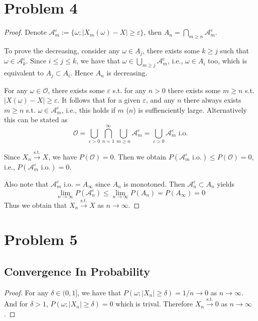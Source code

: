     \section{Problem 4}
    \begin{proof}
        Denote $\mathcal A_m^\varepsilon:=\{\omega;|X_m(\omega)-X|\geq\varepsilon\}$,
        then $A_n=\bigcap_{m\geq n}\mathcal A_m^\varepsilon$.

        To prove the decreasing, consider any $\omega\in A_j$,
        there exists some $k\geq j$ such that $\omega\in\mathcal A_k^\varepsilon$.
        Since $i\leq j\leq k$, we have that $\omega\in\bigcup_{m\geq j}\mathcal A_m^\varepsilon$,
        i.e., $\omega\in A_i$ too, which is equivalent to $A_j\subset A_i$. Hence
        $A_n$ is decreasing.

        For any $\omega\in\mathcal O$, there exists some $\varepsilon$ s.t.
        for any $n>0$ there exists some $m\geq n$ s.t. $|X(\omega)-X|\geq\varepsilon$.
        It follows that for a given $\varepsilon$, and any $n$ there always
        exists $m\geq n$ s.t. $\omega\in\mathcal A_m^\varepsilon$, i.e.,
        this holds if $m$ ($n$) is suffienciently large.
        Alternatively this can be stated as
        \[\mathcal O=\bigcup_{\varepsilon>0}\bigcap_{n=1}^\infty
        \bigcup_{m\geq n}\mathcal A_m^\varepsilon
        =\bigcup_{\varepsilon>0}\mathcal A_m^\varepsilon\text{ i.o.}\]

        Since $X_n\xrightarrow{\mathrm{s.t.}}X$, we have $P(\mathcal O)=0$.
        Then we obtain $P(\mathcal A_m^\varepsilon\text{ i.o.})\leq
        P(\mathcal{O})=0$, i.e., $P(\mathcal A_m^\varepsilon\text{ i.o.})=0$.
        
        Also note that $\mathcal A_m^\varepsilon\text{ i.o.}=A_\infty$ since
        $A_n$ is monotoned. Then $\mathcal A_n^\varepsilon
        \subset A_n$ yields
        \[\lim_{n\to\infty}P(\mathcal A_n^\varepsilon)
        \leq\lim_{n\to\infty}P(A_n)=P(A_\infty)=0\]
        Thus we obtain that $X_n\xrightarrow{\mathrm{s.t.}}X$ as
        $n\to\infty$.
    \end{proof}

    \section{Problem 5}
    \subsection{Convergence In Probability}
    \begin{proof}
        For any $\delta\in(0,1]$, we have that $P(\omega;|X_n|\geq\delta)
        =1/n\to 0$ as $n\to\infty$. And for $\delta>1$, $P(\omega;|X_n|\geq\delta)
        =0$ which is trival. Therefore $X_n\xrightarrow{\mathrm{s.t.}}0$ as
        $n\to\infty$.
    \end{proof}

